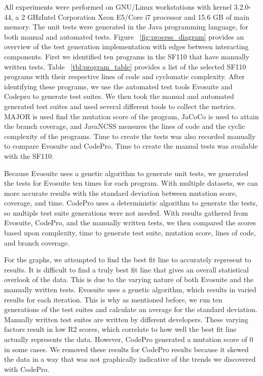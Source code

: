 \documentclass[conference]{IEEEtran}
\begin{document}
All experiments were performed on GNU/Linux workstations with kernel 3.2.0-44, a 2 GHzIntel Corporation Xeon E5/Core i7 processor and  15.6 GB of main memory. The unit tests were generated in the Java programming language, for both manual and automated tests. Figure ~\ref{fig:process_diagram}  provides an overview of the test generation implementation with edges between interacting components. First we identified ten programs in the SF110 that have manually written tests. Table ~\ref{tbl:program_table} provides a list of the selected SF110 programs with their respective lines of code and cyclomatic complexity.  After identifying these programs, we use the automated test tools Evosuite and Codepro to generate test suites. We then took the manual and automated generated test suites and used several different tools to collect the metrics. MAJOR is used find the mutation score of the program, JaCoCo is used to attain the branch coverage, and JavaNCSS measures the lines of code and the cyclic complexity of the programs. Time to create the tests was also recorded manually to compare Evosuite and CodePro. Time to create the manual tests was available with the SF110.

Because Evosuite uses a genetic algorithm to generate unit tests, we generated the tests for Evosuite ten times for each program. With multiple datasets, we can more accurate results with the standard deviation between mutation score, coverage, and time. CodePro uses a deterministic algorithm to generate the tests, so multiple test suite generations were not needed. With results gathered from Evosuite, CodePro, and the manually written tests, we then compared the scores based upon complexity, time to generate test suite, mutation score, lines of code, and branch coverage.

For the graphs, we attempted to find the best fit line to accurately represent to results. It is difficult to find a truly best fit line that gives an overall statistical overlook of the data. This is due to the varying nature of both Evosuite and the manually written tests. Evosuite uses a genetic algorithm, which results in varied results for each iteration. This is why as mentioned before, we run ten generations of the test suites and calculate an average for the standard deviation. Manually written test suites are written by different developers. These varying factors result in low  R2 scores, which correlate to how well the best fit line actually represents the data. However, CodePro generated a mutation score of 0 in some cases. We removed these results for CodePro results because it skewed the data in a way that was not graphically indicative of the trends we discovered with CodePro. 
\end{document}
